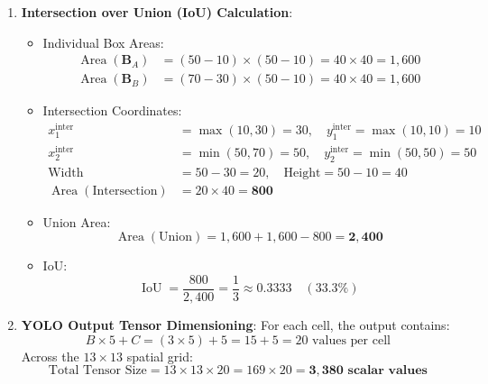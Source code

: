 \begin{enumerate}
    \item \textbf{Intersection over Union (IoU) Calculation}:
    \begin{itemize}
        \item Individual Box Areas:
        \begin{align*}
        \operatorname{Area}(\mathbf{B}_A) &= (50 - 10) \times (50 - 10) = 40 \times 40 = 1{,}600 \\
        \operatorname{Area}(\mathbf{B}_B) &= (70 - 30) \times (50 - 10) = 40 \times 40 = 1{,}600
        \end{align*}
        \item Intersection Coordinates:
        \begin{align*}
        x_1^{\text{inter}} &= \max(10, 30) = 30, \quad y_1^{\text{inter}} = \max(10, 10) = 10 \\
        x_2^{\text{inter}} &= \min(50, 70) = 50, \quad y_2^{\text{inter}} = \min(50, 50) = 50 \\
        \text{Width} &= 50 - 30 = 20, \quad \text{Height} = 50 - 10 = 40 \\
        \operatorname{Area}(\text{Intersection}) &= 20 \times 40 = \mathbf{800}
        \end{align*}
        \item Union Area:
        \begin{equation*}
        \operatorname{Area}(\text{Union}) = 1{,}600 + 1{,}600 - 800 = \mathbf{2{,}400}
        \end{equation*}
        \item IoU:
        \begin{equation*}
        \operatorname{IoU} = \frac{800}{2{,}400} = \frac{1}{3} \approx \mathbf{0.3333} \quad (33.3\%)
        \end{equation*}
    \end{itemize}

    \item \textbf{YOLO Output Tensor Dimensioning}:
    For each cell, the output contains:
    \begin{equation*}
    B \times 5 + C = (3 \times 5) + 5 = 15 + 5 = 20 \text{ values per cell}
    \end{equation*}
    Across the $13 \times 13$ spatial grid:
    \begin{equation*}
    \text{Total Tensor Size} = 13 \times 13 \times 20 = 169 \times 20 = \mathbf{3{,}380 \text{ scalar values}}
    \end{equation*}


\end{enumerate}
